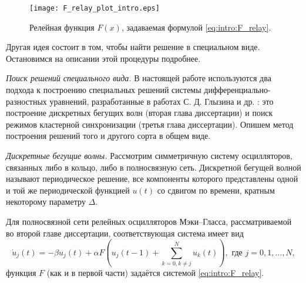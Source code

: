 \begin{figure}[ht]
	\centering
	\texttt{[image: F\_relay\_plot\_intro.eps]}
	\caption{Релейная функция $F(x)$, задаваемая формулой \eqref{eq:intro:F_relay}.}
	\label{fig:F_relay_plot:intro}
\end{figure}

Другая идея состоит в том, чтобы найти решение в специальном виде. Остановимся на описании этой процедуры подробнее.


\textit{Поиск решений специального вида.} В настоящей работе используются два подхода к построению специальных решений системы дифференциально-разностных уравнений, разработанные в работах С. Д. Глызина и др. \cite{GlyKol2013, GlyKol2013a, Glyzin2014}: это построение дискретных бегущих волн (вторая глава диссертации) и поиск режимов кластерной синхронизации (третья глава диссертации). Опишем метод построения решений того и другого сорта в общем виде.

\textit{Дискретные бегущие волны.} Рассмотрим симметричную систему осцилляторов, связанных либо в кольцо, либо в полносвязную сеть. Дискретной бегущей волной называют периодическое решение, все компоненты которого представлены одной и той же периодической функцией $u(t)$ со сдвигом по времени, кратным некоторому параметру $\Delta$.


Для полносвязной сети релейных осцилляторов Мэки--Гласса, рассматриваемой во второй главе диссертации, соответствующая система имеет вид
%
\begin{equation}
	\label{eq:intro:mg_full_renormed}
	\dot{u}_j(t) = -\beta u_j(t) + \alpha F \left(u_j(t - 1) + \sum\limits_{k = 0, k\neq j}^N u_k(t)\right), \text{ где } j = 0, 1, \dots, N,
\end{equation}
функция $F$ (как и в первой части) задаётся системой \eqref{eq:intro:F_relay}.


